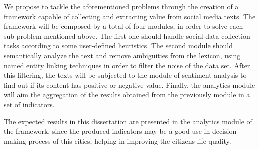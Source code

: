We propose to tackle the aforementioned problems through the creation of a framework capable of collecting and extracting value from social media texts. The framework will be composed by a total of four modules, in order to solve each sub-problem mentioned above. The first one should handle social-data-collection tasks according to some user-defined heuristics. The second module should semantically analyze the text and remove ambiguities from the lexicon, using named entity linking techniques in order to filter the noise of the data set. After this filtering, the texts will be subjected to the module of sentiment analysis to find out if its content has positive or negative value. Finally, the analytics module will aim the aggregation of the results obtained from the previously module in a set of indicators.

The expected results in this dissertation are presented in the analytics module of the framework, since the produced indicators may be a good use in decision-making process of this cities, helping in improving the citizens life quality.
